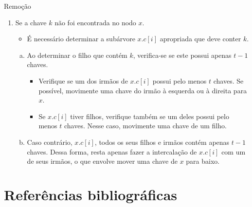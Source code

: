 \documentclass[aspectratio=169]{beamer}
\begin{document}
\begin{frame}{Remoção}
 \begin{enumerate}[(3)]
  \item Se a chave $k$ não foi encontrada no nodo $x$. 
  \begin{itemize}
    \item É necessário determinar a subárvore $x.c[i]$ apropriada que deve conter $k$.
  \end{itemize}
  \begin{enumerate}[(a)]
  \item Ao determinar o filho que contém $k$, verifica-se se este possui apenas $t-1$ chaves.
  \begin{itemize}
  \item Verifique se um dos irmãos de $x.c[i]$ possui pelo menos $t$ chaves. Se possível, movimente uma chave do irmão à esquerda ou à direita para $x$.
  \item Se  $x.c[i]$ tiver filhos, verifique também se um deles possui pelo menos $t$ chaves. Nesse caso, movimente uma chave de um filho.
  \end{itemize}
  \item Caso contrário, $x.c[i]$, todos os seus filhos e irmãos contém apenas $t-1$ chaves. Dessa forma, resta apenas fazer a intercalação de $x.c[i]$ com um de seus irmãos, o que envolve mover uma chave de $x$ para baixo.
  \end{enumerate} 
 \end{enumerate}
\end{frame}


%

 
\section{Referências bibliográficas}
  
\end{document}
